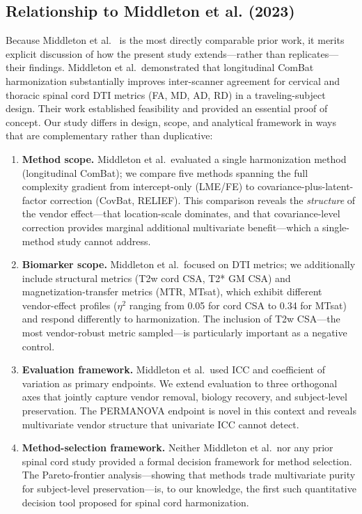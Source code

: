 \documentclass[12pt,a4paper]{article}
\begin{document}
\subsection{Relationship to Middleton et al. (2023)}

Because Middleton et al.\ \cite{middleton2023spinal} is the most directly comparable prior work, it merits explicit discussion of how the present study extends---rather than replicates---their findings. Middleton et al.\ demonstrated that longitudinal ComBat harmonization substantially improves inter-scanner agreement for cervical and thoracic spinal cord DTI metrics (FA, MD, AD, RD) in a traveling-subject design. Their work established feasibility and provided an essential proof of concept. Our study differs in design, scope, and analytical framework in ways that are complementary rather than duplicative:

\begin{enumerate}[nosep]
  \item \textbf{Method scope.} Middleton et al.\ evaluated a single harmonization method (longitudinal ComBat); we compare five methods spanning the full complexity gradient from intercept-only (LME/FE) to covariance-plus-latent-factor correction (CovBat, RELIEF). This comparison reveals the \emph{structure} of the vendor effect---that location-scale dominates, and that covariance-level correction provides marginal additional multivariate benefit---which a single-method study cannot address.
  \item \textbf{Biomarker scope.} Middleton et al.\ focused on DTI metrics; we additionally include structural metrics (T2w cord CSA, T2* GM CSA) and magnetization-transfer metrics (MTR, MTsat), which exhibit different vendor-effect profiles ($\eta^2$ ranging from 0.05 for cord CSA to 0.34 for MTsat) and respond differently to harmonization. The inclusion of T2w CSA---the most vendor-robust metric sampled---is particularly important as a negative control.
  \item \textbf{Evaluation framework.} Middleton et al.\ used ICC and coefficient of variation as primary endpoints. We extend evaluation to three orthogonal axes that jointly capture vendor removal, biology recovery, and subject-level preservation. The PERMANOVA endpoint is novel in this context and reveals multivariate vendor structure that univariate ICC cannot detect.
  \item \textbf{Method-selection framework.} Neither Middleton et al.\ nor any prior spinal cord study provided a formal decision framework for method selection. The Pareto-frontier analysis---showing that methods trade multivariate purity for subject-level preservation---is, to our knowledge, the first such quantitative decision tool proposed for spinal cord harmonization.
\end{enumerate}
\end{document}
